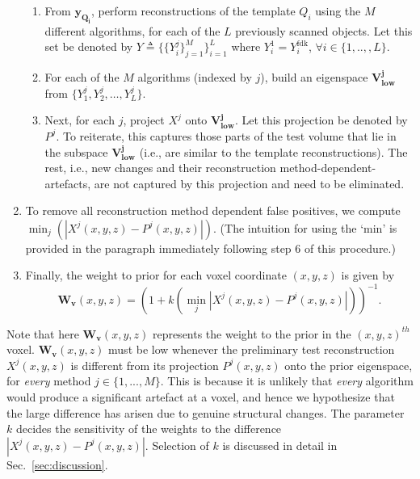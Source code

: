 \documentclass[journal]{IEEEtran}
\begin{document}
\begin{enumerate}
\begin{enumerate}
  \item From $\boldsymbol{y_{Q_i}}$, perform reconstructions of the
    template $Q_i$ using the $M$ different algorithms, for each of the
    $L$ previously scanned objects. Let this set be denoted by $Y
    \triangleq \{\{Y_{i}^j\}_{j=1}^M\}_{i=1}^L$ where $Y^{1}_i =
    Y^{\text{fdk}}_i$, $\forall i \in \{1,..,,L\}$.


  \item For each of the $M$ algorithms (indexed by $j$), build an
    eigenspace $\boldsymbol{V_\text{low}^j}$ from $\{Y_1^j,Y_2^j,
    \ldots, Y_{L}^j\}$. %

  \item Next, for each $j$, project $X^j$ onto
    $\boldsymbol{V_\text{low}^j}$. Let this projection be denoted by
    $P^j$. To reiterate, this captures those parts of the test volume
    that lie in the subspace $\boldsymbol{V_\text{low}^j}$ (i.e., are
    similar to the template reconstructions). The rest, i.e., new
    changes and their reconstruction method-dependent-artefacts, are
    not captured by this projection and need to be eliminated.
  \end{enumerate}
\item To remove all reconstruction method dependent false positives,
  we compute $\min_{j}(|X^j(x,y,z) - P^j(x,y,z)|)$. (The intuition for
  using the `min' is provided in the paragraph immediately following
  step 6 of this procedure.)
\item Finally, the weight to prior for each voxel coordinate $(x,y,z)$
  is given by
  \begin{equation} 
    \boldsymbol{W_v}(x,y,z) = (1+k(\min_{j}|X^j(x,y,z) - P^j(x,y,z)|))^{-1}.
    \label{eq:weightsEq}
  \end{equation}
\end{enumerate}
\vspace{0.01mm}
Note that here $\boldsymbol{W_v}(x,y,z)$ represents the weight to the prior in the $(x,y,z)^{th}$ voxel. $\boldsymbol{W_v}(x,y,z)$ must be
low whenever the preliminary test reconstruction $X^j(x,y,z)$ is different from its projection $P^j(x,y,z)$ onto the prior eigenspace, for \emph{every} method $j \in \{1,...,M\}$. This is
because it is unlikely that \emph{every} algorithm would produce a significant artefact at a voxel, and hence we hypothesize that the large difference has arisen due to genuine structural changes. The parameter $k$ decides the sensitivity of the weights to the difference $|X^j(x,y,z) - P^j(x,y,z)|$.  
Selection of $k$ is discussed in detail in Sec.~\ref{sec:discussion}.\\
\end{document}
